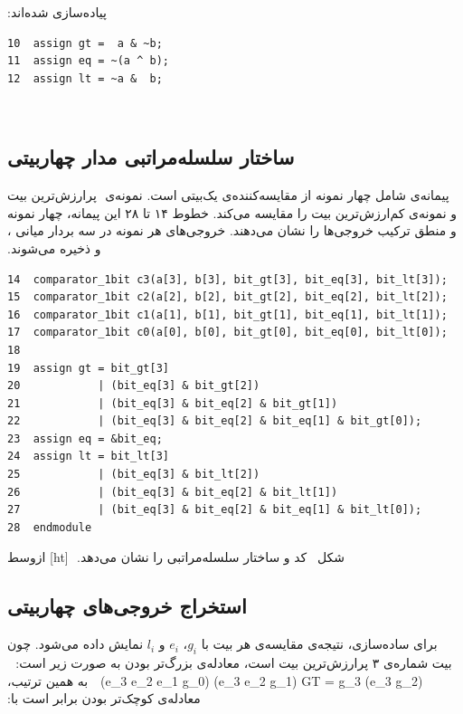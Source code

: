 ‫پیاده‌سازی شده‌اند:
‫
\begin{dsdlcodeblock}
\begin{verbatim}
10  assign gt =  a & ~b;
11  assign eq = ~(a ^ b);
12  assign lt = ~a &  b;
\end{verbatim}
\end{dsdlcodeblock}
‫
‫
‫\subsection{ساختار سلسله‌مراتبی مدار چهاربیتی}
‫
‫پیمانه‌ی  شامل چهار نمونه از مقایسه‌کننده‌ی یک‌بیتی است. نمونه‌ی
‫ پرارزش‌ترین بیت و نمونه‌ی  کم‌ارزش‌ترین بیت را مقایسه می‌کند. خطوط
‫۱۴ تا ۲۸ این پیمانه، چهار نمونه و منطق ترکیب خروجی‌ها را نشان می‌دهند. خروجی‌های هر نمونه در سه بردار میانی ،  و  ذخیره می‌شوند.
‫
\begin{dsdlcodeblock}
\begin{verbatim}
14  comparator_1bit c3(a[3], b[3], bit_gt[3], bit_eq[3], bit_lt[3]);
15  comparator_1bit c2(a[2], b[2], bit_gt[2], bit_eq[2], bit_lt[2]);
16  comparator_1bit c1(a[1], b[1], bit_gt[1], bit_eq[1], bit_lt[1]);
17  comparator_1bit c0(a[0], b[0], bit_gt[0], bit_eq[0], bit_lt[0]);
18
19  assign gt = bit_gt[3]
20            | (bit_eq[3] & bit_gt[2])
21            | (bit_eq[3] & bit_eq[2] & bit_gt[1])
22            | (bit_eq[3] & bit_eq[2] & bit_eq[1] & bit_gt[0]);
23  assign eq = &bit_eq;
24  assign lt = bit_lt[3]
25            | (bit_eq[3] & bit_lt[2])
26            | (bit_eq[3] & bit_eq[2] & bit_lt[1])
27            | (bit_eq[3] & bit_eq[2] & bit_eq[1] & bit_lt[0]);
28  endmodule
\end{verbatim}
\end{dsdlcodeblock}
‫
‫شکل~ کد و ساختار سلسله‌مراتبی را نشان می‌دهد.
‫
‫[ht]
‫‌ازوسط
‫
‫
‫
‫
‫
‫
‫\subsection{استخراج خروجی‌های چهاربیتی}
‫
‫برای ساده‌سازی، نتیجه‌ی مقایسه‌ی هر بیت با $g_i$، $e_i$ و $l_i$ نمایش داده می‌شود. چون
‫بیت شماره‌ی ۳ پرارزش‌ترین بیت است، معادله‌ی بزرگ‌تر بودن به صورت زیر است:
‫
‫
‫GT = g_3 \vee (e_3 \wedge g_2)
‫\vee (e_3 \wedge e_2 \wedge g_1)
‫\vee (e_3 \wedge e_2 \wedge e_1 \wedge g_0)
‫
‫
‫به همین ترتیب، معادله‌ی کوچک‌تر بودن برابر است با:
